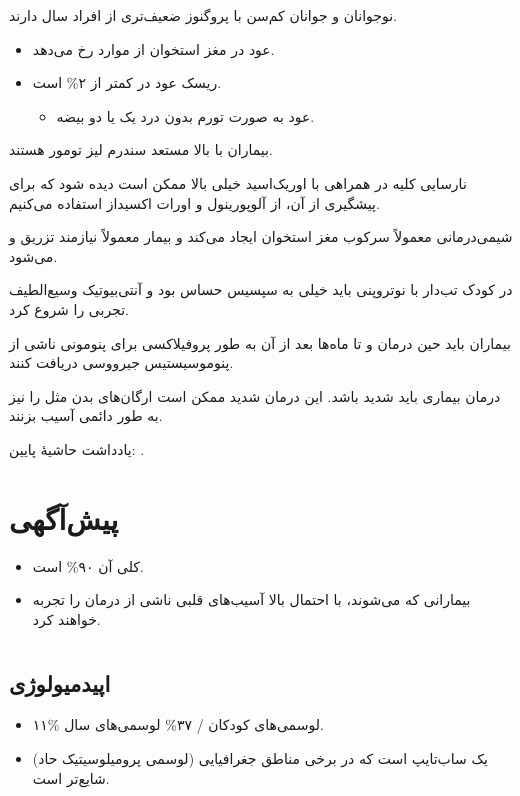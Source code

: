 \documentclass[12pt,a4paper]{article}
\begin{document}
نوجوانان و جوانان کم‌سن با  پروگنوز ضعیف‌تری از افراد  سال دارند.
\begin{itemize}
\item عود در مغز استخوان  از موارد  رخ می‌دهد.
\item ریسک عود در  کمتر از ۲\% است.
\begin{itemize}
\item عود به صورت تورم بدون درد یک یا دو بیضه.
\end{itemize}
\end{itemize}
بیماران با  بالا مستعد سندرم لیز تومور هستند.

نارسایی کلیه در همراهی با اوریک‌اسید خیلی بالا ممکن است دیده شود که برای پیشگیری از آن، از آلوپورینول و اورات اکسیداز استفاده می‌کنیم.

شیمی‌درمانی معمولاً سرکوب مغز استخوان ایجاد می‌کند و بیمار معمولاً نیازمند تزریق  و  می‌شود.

در کودک تب‌دار با نوتروپنی باید خیلی به سپسیس حساس بود و آنتی‌بیوتیک وسیع‌الطیف تجربی را شروع کرد.

بیماران باید حین درمان و تا ماه‌ها بعد از آن به طور پروفیلاکسی برای پنومونی ناشی از پنوموسیستیس جیرووسی  دریافت کنند.

درمان بیماری باید شدید باشد. این درمان شدید ممکن است ارگان‌های بدن مثل  را نیز به طور دائمی آسیب بزنند.

یادداشت حاشیهٔ پایین: .

\section*{پیش‌آگهی }
\begin{itemize}
\item {} کلی آن ۹۰\% است.
\item بیمارانی که  می‌شوند، با احتمال بالا آسیب‌های قلبی ناشی از درمان را تجربه خواهند کرد.
\end{itemize}
\section*{}
\subsection*{اپیدمیولوژی}
\begin{itemize}
\item ۱۱\% لوسمی‌های کودکان / ۳۷\% لوسمی‌های  سال.
\item {} (لوسمی پرومیلوسیتیک حاد) یک ساب‌تایپ  است که در برخی مناطق جغرافیایی شایع‌تر است.
\end{itemize}
\end{document}
